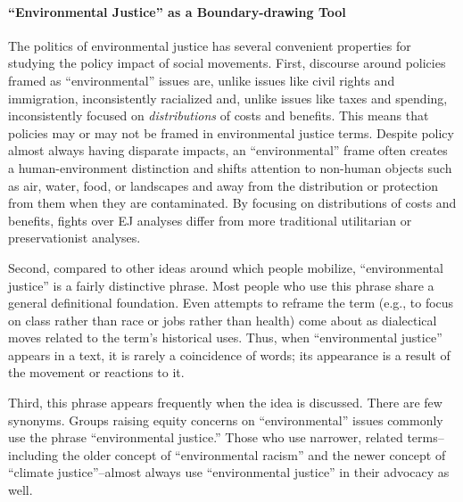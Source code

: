 \documentclass[
      12pt,
        ]{article}
\begin{document}
\hypertarget{environmental-justice-as-a-boundary-drawing-tool}{%
\paragraph{``Environmental Justice'' as a Boundary-drawing Tool}\label{environmental-justice-as-a-boundary-drawing-tool}}

The politics of environmental justice has several convenient properties for studying the policy impact of social movements. First, discourse around policies framed as ``environmental'' issues are, unlike issues like civil
rights and immigration, inconsistently racialized and, unlike issues
like taxes and spending, inconsistently focused on \emph{distributions} of
costs and benefits. This means that policies may or may not be framed in environmental justice terms. Despite policy almost always having disparate impacts, an ``environmental'' frame often creates a human-environment distinction and shifts attention to non-human objects such as air, water, food, or landscapes and away from the distribution or
protection from them when they are contaminated. By focusing on distributions of costs and benefits, fights over EJ analyses differ from more traditional utilitarian or preservationist analyses.

Second, compared to
other ideas around which people mobilize, ``environmental justice'' is a
fairly distinctive phrase. Most people who use this phrase share a
general definitional foundation. Even attempts to reframe the term (e.g., to focus on class rather than race or jobs rather than health) come about as dialectical moves related to the term's historical uses. Thus, when ``environmental justice'' appears in a text, it is rarely a coincidence of words; its appearance is a result of the movement or reactions to it.

Third, this phrase appears frequently
when the idea is discussed. There are few synonyms. Groups raising equity concerns on ``environmental'' issues commonly use the phrase ``environmental justice.'' Those who use narrower, related terms--including the older concept of
``environmental racism'' and the newer concept of ``climate justice''--almost always use ``environmental justice'' in their advocacy as well.
\end{document}
